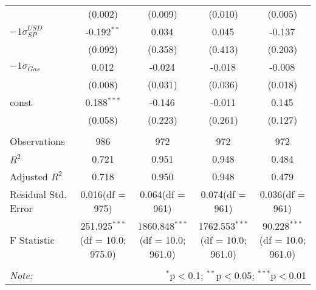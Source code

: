 \begin{table}[!htbp]
\begin{tabular}{@{\extracolsep{5pt}}lcccc}
  & (0.002) & (0.009) & (0.010) & (0.005) \\
 ${	-1 \sigma}^{USD}_{SP}$ & -0.192$^{**}$ & 0.034$^{}$ & 0.045$^{}$ & -0.137$^{}$ \\
  & (0.092) & (0.358) & (0.413) & (0.203) \\
 ${	-1 \sigma}_{Gas}$ & 0.012$^{}$ & -0.024$^{}$ & -0.018$^{}$ & -0.008$^{}$ \\
  & (0.008) & (0.031) & (0.036) & (0.018) \\
 const & 0.188$^{***}$ & -0.146$^{}$ & -0.011$^{}$ & 0.145$^{}$ \\
  & (0.058) & (0.223) & (0.261) & (0.127) \\
\hline \\[-1.8ex]
 Observations & 986 & 972 & 972 & 972 \\
 $R^2$ & 0.721 & 0.951 & 0.948 & 0.484 \\
 Adjusted $R^2$ & 0.718 & 0.950 & 0.948 & 0.479 \\
 Residual Std. Error & 0.016(df = 975) & 0.064(df = 961) & 0.074(df = 961) & 0.036(df = 961)  \\
 F Statistic & 251.925$^{***}$ (df = 10.0; 975.0) & 1860.848$^{***}$ (df = 10.0; 961.0) & 1762.553$^{***}$ (df = 10.0; 961.0) & 90.228$^{***}$ (df = 10.0; 961.0) \\
\hline
\hline \\[-1.8ex]
\textit{Note:} & \multicolumn{4}{r}{$^{*}$p$<$0.1; $^{**}$p$<$0.05; $^{***}$p$<$0.01} \\
\end{tabular}
\end{table}